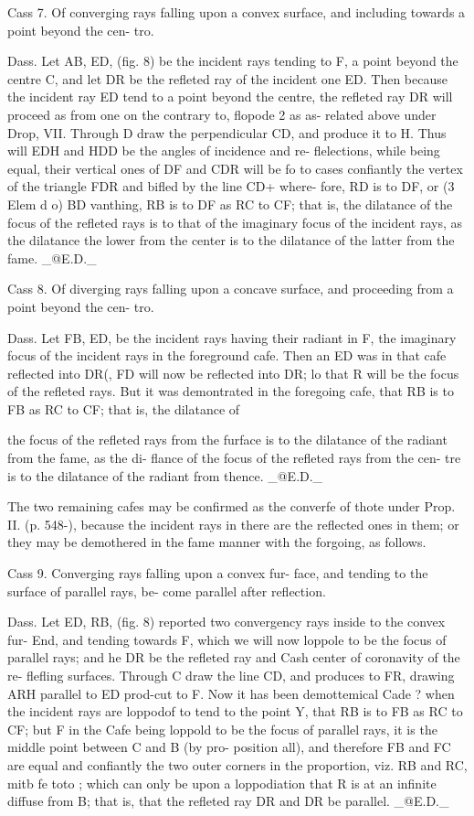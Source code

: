 Cass 7. Of converging rays falling upon a convex surface, and including towards a point beyond the cen- tro.\par\medskip
Dass. Let AB, ED, (fig. 8) be the incident rays tending to F, a point beyond the centre C, and let DR be the refleted ray of the incident one ED. Then because the incident ray ED tend to a point beyond the centre, the refleted ray DR will proceed as from one on the contrary to, flopode 2 as as- related above under Drop, VII. Through D draw the perpendicular CD, and produce it to H. Thus will EDH and HDD be the angles of incidence and re- flelections, while being equal, their vertical ones of DF and CDR will be fo to cases confiantly the vertex of the triangle FDR and bifled by the line CD+ where- fore, RD is to DF, or (3 Elem d o) BD vanthing, RB is to DF as RC to CF; that is, the dilatance of the focus of the refleted rays is to that of the imaginary focus of the incident rays, as the dilatance the lower from the center is to the dilatance of the latter from the fame. \_@E.D.\_\par\medskip
Cass 8. Of diverging rays falling upon a concave surface, and proceeding from a point beyond the cen- tro.\par\medskip
Dass. Let FB, ED, be the incident rays having their radiant in F, the imaginary focus of the incident rays in the foreground cafe. Then an ED was in that cafe reflected into DR(, FD will now be reflected into DR; lo that R will be the focus of the refleted rays. But it was demontrated in the foregoing cafe, that RB is to FB as RC to CF; that is, the dilatance of\par\medskip
the focus of the refleted rays from the furface is to the dilatance of the radiant from the fame, as the di- flance of the focus of the refleted rays from the cen- tre is to the dilatance of the radiant from thence. \_@E.D.\_\par\medskip
The two remaining cafes may be confirmed as the converfe of thote under Prop. II. (p. 548-), because the incident rays in there are the reflected ones in them; or they may be demothered in the fame manner with the forgoing, as follows.\par\medskip
Cass 9. Converging rays falling upon a convex fur- face, and tending to the surface of parallel rays, be- come parallel after reflection.\par\medskip
Dass. Let ED, RB, (fig. 8) reported two convergency rays inside to the convex fur- End, and tending towards F, which we will now loppole to be the focus of parallel rays; and he DR be the refleted ray and Cash center of coronavity of the re- flefling surfaces. Through C draw the line CD, and produces to FR, drawing ARH parallel to ED prod-cut to F. Now it has been demottemical Cade ? when the incident rays are loppodof to tend to the point Y, that RB is to FB as RC to CF; but F in the Cafe being loppold to be the focus of parallel rays, it is the middle point between C and B (by pro- position all), and therefore FB and FC are equal and confiantly the two outer corners in the proportion, viz. RB and RC, mitb fe toto ; which can only be upon a loppodiation that R is at an infinite diffuse from B; that is, that the refleted ray DR and DR be parallel. \_@E.D.\_\par\medskip
